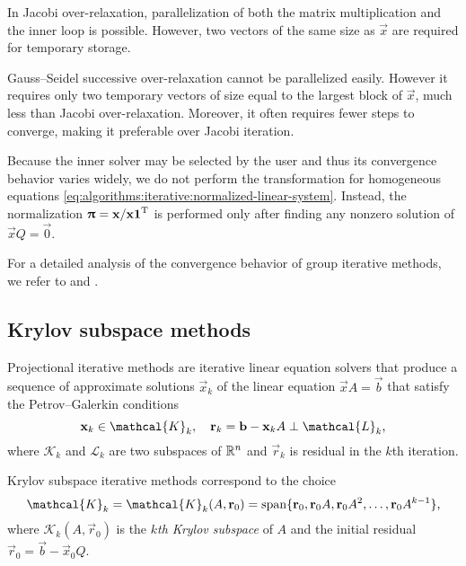 In Jacobi over-relaxation, parallelization of both the matrix
multiplication and the inner loop is possible. However, two vectors of
the same size as $\vec{x}$ are required for temporary storage.

Gauss--Seidel successive over-relaxation cannot be parallelized
easily.  However it requires only two temporary vectors of size equal
to the largest block of $\vec{x}$, much less than Jacobi
over-relaxation. Moreover, it often requires fewer steps to converge,
making it preferable over Jacobi iteration.

Because the inner solver may be selected by the user and thus its
convergence behavior varies widely, we do not perform the
transformation for homogeneous equations
\eqref{eq:algorithms:iterative:normalized-linear-system}. Instead, the
normalization $\bm{\mathrm{\uppi}} = \bm{\mathrm{x}} / \bm{\mathrm{x}}\bm{\mathrm{1}}^{\mathrm{T}}$ is performed
only after finding any nonzero solution of $\vec{x} Q = \vec{0}$.

For a detailed analysis of the convergence behavior of group
iterative methods, we refer to
\citet[Chapter~14]{greenbaum1997iterative} and
\citet{courtois1986block}.

\subsection{Krylov subspace methods}
\label{ssec:algorithms:krylov}

Projectional iterative methods are iterative linear equation solvers
that produce a sequence of approximate solutions $\vec{x}_k$ of the
linear equation $\vec{x} A = \vec{b}$ that satisfy the
Petrov--Galerkin conditions~\citep[Section~5.1.1]{saad2003iterative}
\begin{equation}
  \label{eq:algorithms:krylov:galerkin}
  \vec{x}_k \in \mathcal{K}_k, \quad \vec{r}_k = \vec{b} - \vec{x}_k A
  \perp \mathcal{L}_k \text,
\end{equation}
where $\mathcal{K}_k$ and $\mathcal{L}_k$ are two subspaces of
$\mathbb{R}^n$ and $\vec{r}_k$ is residual in the $k$th iteration.

Krylov subspace iterative methods correspond to the choice
\begin{equation}
  \mathcal{K}_k = \mathcal{K}_{k}(A, \vec{r}_0) = \Span \{ \vec{r}_0,
  \vec{r}_0 A, \vec{r}_0 A^2, \ldots, \vec{r}_0 A^{k - 1} \} \text,
\end{equation}
where $\mathcal{K}_{k}(A, \vec{r}_0)$ is the \emph{$k$th Krylov
  subspace} of $A$ and the initial residual $\vec{r}_0 = \vec{b} -
\vec{x}_0 Q$.

